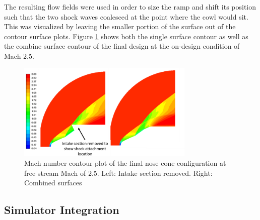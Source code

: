 The resulting flow fields were used in order to size the ramp and shift its position such that the two shock waves coalesced at the point where the cowl would sit. This was visualized by leaving the smaller portion of the surface out of the contour surface plots. Figure \ref{fig:InletCFDCon} shows both the single surface contour as well as the combine surface contour of the final design at the on-design condition of Mach 2.5.

\begin{figure}[H]
\centering
\includegraphics[width=0.75\textwidth]{JWE_Figures/CFD_Contour.png}
\caption{Mach number contour plot of the final nose cone configuration at free stream Mach of 2.5. Left: Intake section removed. Right: Combined surfaces}
\label{fig:InletCFDCon}
\end{figure}

\subsection{Simulator Integration}
